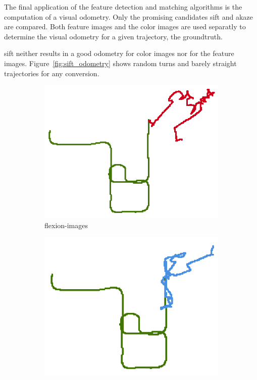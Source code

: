 The final application of the feature detection and matching algorithms is the computation of a visual odometry.
Only the promising candidates \acrshort{sift} and \acrshort{akaze} are compared.
Both feature images and the color images are used separatly to determine the visual odometry for a given trajectory, the groundtruth.

\acrshort{sift} neither results in a good odometry for color images nor for the feature images.
Figure~\ref{fig:sift_odometry} shows random turns and barely straight trajectories for any conversion.
\begin{figure}[t]
\begin{subfigure}[b]{0.31\linewidth}
    \includegraphics[width=\linewidth]{chapter06/odo/jonas_flexion_SIFT_nice.png}%
    \caption{\glspl{flexion-image}}
\end{subfigure}%
\begin{subfigure}[b]{0.31\linewidth}
    \includegraphics[width=\linewidth]{chapter06/odo/jonas_bearing_SIFT_nice.png}%

\end{subfigure}
\end{figure}
